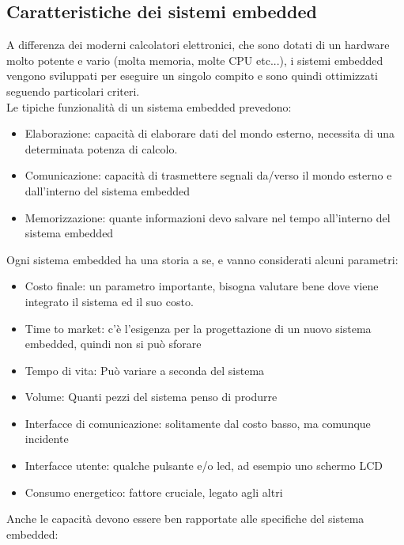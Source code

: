 \documentclass{article}
\begin{document}
\subsection{Caratteristiche dei sistemi embedded}
A differenza dei moderni calcolatori elettronici, che sono dotati di un hardware molto potente e vario (molta memoria, molte CPU etc...), i sistemi embedded vengono sviluppati per eseguire un singolo compito e sono quindi ottimizzati seguendo particolari criteri.\\ Le tipiche funzionalità di un sistema embedded prevedono:
\begin{itemize}
\item Elaborazione: capacità di elaborare dati del mondo esterno, necessita di una determinata potenza di calcolo.
\item Comunicazione: capacità di trasmettere segnali da/verso il mondo esterno e dall'interno del sistema embedded
\item Memorizzazione: quante informazioni devo salvare nel tempo all'interno del sistema embedded
\end{itemize}
Ogni sistema embedded ha una storia a se, e vanno considerati alcuni parametri:
\begin{itemize}
\item Costo finale: un parametro importante, bisogna valutare bene dove viene integrato il sistema ed il suo costo.
\item Time to market: c'è l'esigenza per la progettazione di un nuovo sistema embedded, quindi non si può sforare
\item Tempo di vita: Può variare a seconda del sistema
\item Volume: Quanti pezzi del sistema penso di produrre
\item Interfacce di comunicazione: solitamente dal costo basso, ma comunque incidente
\item Interfacce utente: qualche pulsante e/o led, ad esempio uno schermo LCD
\item Consumo energetico: fattore cruciale, legato agli altri
\end{itemize}
Anche le capacità devono essere ben rapportate alle specifiche del sistema embedded:
\end{document}
